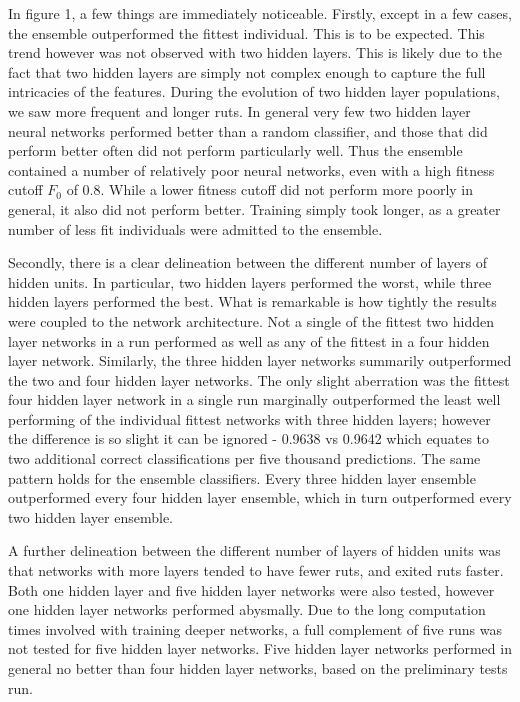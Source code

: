 \documentclass{article}
\DeclareMathOperator{\1}{\mathbbm{1}}
\begin{document}
In figure 1, a few things are immediately noticeable. Firstly, except in a few cases, the ensemble outperformed the fittest individual. 
This is to be expected. This trend however was not observed with two hidden layers. This is likely due to the fact that
two hidden layers are simply not complex enough to capture the full intricacies of the features. During the evolution of
two hidden layer populations, we saw more frequent and longer ruts. In general very few two hidden layer neural networks
performed better than a random classifier, and those that did perform better often did not perform particularly well. 
Thus the ensemble contained a number of relatively poor neural networks, even with a high fitness cutoff $F_0$ of 0.8.
While a lower fitness cutoff did not perform more poorly in general, it also did not perform better. Training simply
took longer, as a greater number of less fit individuals were admitted to the ensemble.

Secondly, there is a clear delineation between the different number of layers of hidden units. In particular, two hidden
layers performed the worst, while three hidden layers performed the best. What is remarkable is how tightly the 
results were coupled to the network architecture. Not a single of the fittest two hidden layer networks in a run
performed as well as any of the fittest in a four hidden layer network. Similarly, the three hidden layer networks summarily
outperformed the two and four hidden layer networks. The only slight aberration was the fittest four hidden layer
network in a single run marginally outperformed the least well performing of the individual fittest networks with three hidden
layers; however the difference is so slight it can be ignored - 0.9638 vs 0.9642 which equates to two additional correct classifications
per five thousand predictions. The same pattern holds for the ensemble classifiers. Every three
hidden layer ensemble outperformed every four hidden layer ensemble, which in turn outperformed every two hidden layer
ensemble. 

A further delineation between the different number of layers of hidden units was that networks with more layers tended to have fewer
ruts, and exited ruts faster. Both one hidden layer and five hidden layer networks were also tested, however one hidden layer networks 
performed abysmally. Due to the long computation times involved with training deeper networks, a full complement of five runs was not
tested for five hidden layer networks. Five hidden layer networks performed in general no better than four hidden layer networks,
based on the preliminary tests run. 
\end{document}
